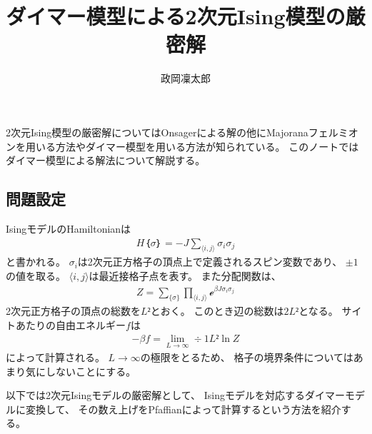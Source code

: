 \documentclass[12pt]{ltjsarticle}
\begin{document}
\title{ダイマー模型による2次元Ising模型の厳密解}
\author{政岡凜太郎}
\date{}
\maketitle

2次元Ising模型の厳密解についてはOnsagerによる解の他にMajoranaフェルミオンを用いる方法やダイマー模型を用いる方法が知られている。
このノートではダイマー模型による解法について解説する。

\subsection*{
    問題設定
}
IsingモデルのHamiltonianは
\begin{align}
    H｛σ｝ = -J∑_{⟨i,j⟩}σ_iσ_j
\end{align}
と書かれる。
$σ_i$は2次元正方格子の頂点上で定義されるスピン変数であり、
$±1$の値を取る。
$⟨i,j⟩$は最近接格子点を表す。
また分配関数は、
\begin{align}
    Z = ∑_{\{σ\}}∏_{⟨i,j⟩}ℯ^{βJσ_iσ_j}
\end{align}
2次元正方格子の頂点の総数を$L²$とおく。
このとき辺の総数は$2L²$となる。
サイトあたりの自由エネルギー$f$は
\begin{align}
    -βf = \lim_{L → ∞}÷1{L²}\ln Z
\end{align}
によって計算される。
$L → ∞$の極限をとるため、
格子の境界条件についてはあまり気にしないことにする。

以下では2次元Isingモデルの厳密解として、
Isingモデルを対応するダイマーモデルに変換して、
その数え上げをPfaffianによって計算するという方法を紹介する。
\end{document}
